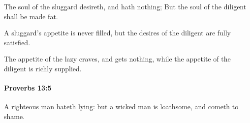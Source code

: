 			\begin{versebox}
					\item[BHS] 
					\item[ASV] The soul of the sluggard desireth, and hath nothing; But the soul of the diligent shall be made fat.
					\item[NIV] A sluggard’s appetite is never filled, but the desires of the diligent are fully satisfied.
					\item[NRSV] The appetite of the lazy craves, and gets nothing, while the appetite of the diligent is richly supplied.
			\end{versebox}

		\paragraph{Proverbs 13:5} %
			\label{PROVERBS-13-5}

			A righteous man hateth lying: but a wicked man is loathsome, and cometh to shame.

